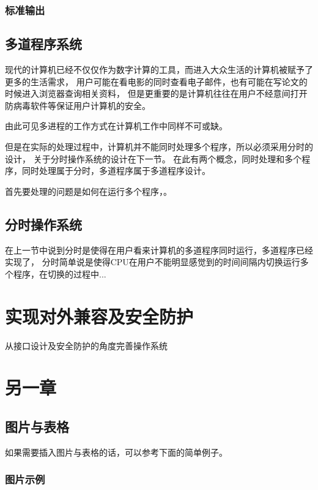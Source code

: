 \documentclass{swfcthesis}
\begin{document}
		\subsection{标准输出}
		
                
	\section{多道程序系统}

		现代的计算机已经不仅仅作为数字计算的工具，而进入大众生活的计算机被赋予了更多的生活需求，
		用户可能在看电影的同时查看电子邮件，也有可能在写论文的时候进入浏览器查询相关资料，
		但是更重要的是计算机往往在用户不经意间打开防病毒软件等保证用户计算机的安全\cite{tanenbaum2009modern}。

		由此可见多进程的工作方式在计算机工作中同样不可或缺。

		但是在实际的处理过程中，计算机并不能同时处理多个程序，所以必须采用分时的设计，
		关于分时操作系统的设计在下一节。
		在此有两个概念，同时处理和多个程序，同时处理属于分时，多道程序属于多道程序设计。

		首先要处理的问题是如何在运行多个程序，。

	\section{分时操作系统}

		在上一节中说到分时是使得在用户看来计算机的多道程序同时运行，多道程序已经实现了，
		分时简单说是使得CPU在用户不能明显感觉到的时间间隔内切换运行多个程序，在切换的过程中...
	
\chapter{实现对外兼容及安全防护}

从接口设计及安全防护的角度完善操作系统


\chapter{另一章}

\section{图片与表格}

如果需要插入图片与表格的话，可以参考下面的简单例子。

\subsection{图片示例}
\end{document}
